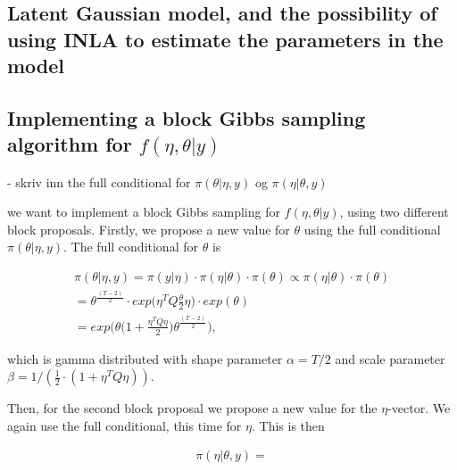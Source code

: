 


\subsection{Latent Gaussian model, and the possibility of using INLA to estimate the parameters in the model}




\subsection{Implementing a block Gibbs sampling algorithm for $f(\eta, \theta |y)$}

- skriv inn the full conditional for $\pi(\theta|\eta, y)$ og $\pi(\eta|\theta, y)$


we want to implement a block Gibbs sampling for $f(\eta, \theta | y)$, using two different block proposals. Firstly, we propose a new value for $\theta$ using the full conditional $\pi(\theta|\eta, y)$. The full conditional for $\theta$ is 

\begin{align}
    \pi(\theta| \eta, y) = \pi(y|\eta) \cdot \pi(\eta|\theta) \cdot \pi(\theta) \propto \pi(\eta|\theta) \cdot \pi(\theta) \nonumber \\
    = \theta^{\frac{(T-2)}{2}} \cdot exp \Big( \eta^T Q \frac{\theta}{2} \eta \Big) \cdot exp(\theta) \nonumber \\
    = exp \Big(  \theta \big(1 + \frac{\eta^T Q \eta}{2}  \big) \theta^{\frac{(T-2)}{2}}  \Big), 
\end{align}

which is gamma distributed with shape parameter $\alpha = T/2$ and scale parameter $\beta = 1/(\frac{1}{2}\cdot (1 + \eta^T Q \eta))$.

Then, for the second block proposal we propose a new value for the $\eta$-vector. We again use the full conditional, this time for $\eta$. This is then 

\begin{align}
    \pi(\eta | \theta, y) = 
\end{align}

